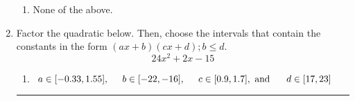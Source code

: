 \documentclass[14pt]{extbook}
\newcommand{\litem}[1]{\item#1\hspace*{-1cm}\rule{\textwidth}{0.4pt}}
\begin{document}
\begin{enumerate}
{\begin{enumerate}[label=\Alph*.]
\item None of the above.
\end{enumerate} }
\litem{
Factor the quadratic below. Then, choose the intervals that contain the constants in the form $(ax+b)(cx+d); b \leq d.$\[ 24x^{2} +2 x -15 \]\begin{enumerate}[label=\Alph*.]
\item \( a \in [-0.33, 1.55], \hspace*{5mm} b \in [-22, -16], \hspace*{5mm} c \in [0.9, 1.7], \text{ and } \hspace*{5mm} d \in [17, 23] \)

\end{enumerate}}
\end{enumerate}
\end{document}

